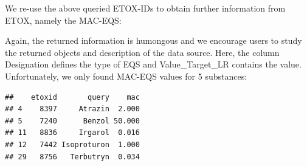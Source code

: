 We re-use the above queried ETOX-IDs to obtain further information from ETOX, namely the MAC-EQS:
\begin{knitrout}
\color{fgcolor}\begin{kframe}
\begin{alltt}
 \hlkwb{<-} \hlopt{$}
\hlopt{$} \hlkwb{<-}  \hlstd{(}\hlstd{)\{}
   \hlstd{(} \hlopt{==}  \hlopt{&&} 
    \hlstd{(}\hlstd{)}
  \hlstd{\}}  \hlstd{\{}
     \hlkwb{<-} \hlopt{$}
    \hlstd{(res[res}\hlopt{$} \hlopt{==}  \hlopt{&}
              \hlopt{$} \hlopt{==} \hlstd{,} \hlstd{])}
  \hlstd{\}}
\hlstd{\})}
\end{alltt}
\end{kframe}
\end{knitrout}

Again, the returned information is humongous and we encourage users to study the returned objects and description of the data source.
Here, the column Designation defines the type of EQS and Value\_Target\_LR contains the value.
Unfortunately, we only found MAC-EQS values for 5 substances:

\begin{knitrout}
\color{fgcolor}\begin{kframe}
\begin{alltt}
 \hlkwb{<-} \hlstd{(ids, ids[}\hlopt{!} \hlopt{&} 
                      \hlstd{(}\hlstd{,} \hlstd{,} \hlstd{)]))}
\end{alltt}
\begin{verbatim}
##    etoxid       query    mac
## 4    8397     Atrazin  2.000
## 5    7240      Benzol 50.000
## 11   8836     Irgarol  0.016
## 12   7442 Isoproturon  1.000
## 29   8756   Terbutryn  0.034
\end{verbatim}
\end{kframe}
\end{knitrout}

